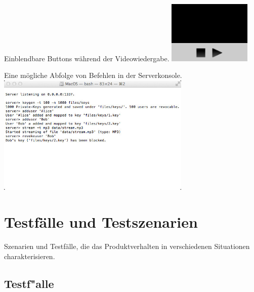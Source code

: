 \documentclass[a4paper,10pt]{scrartcl}
\begin{document}
\begin{illustration}{Einblendbare Buttons während der Videowiedergabe.}
\includegraphics[width=150px]{figures/images/videoscreen.jpg}
\end{illustration}
\begin{illustration}{Eine mögliche Abfolge von Befehlen in der Serverkonsole.}
\includegraphics[width=350px]{figures/images/serverterminal.jpg}
\end{illustration}

\section{Testfälle und Testszenarien}
Szenarien und Testfälle, die das Produktverhalten in verschiedenen Situationen charakterisieren.
\subsection{Testf"alle}
\end{document}
